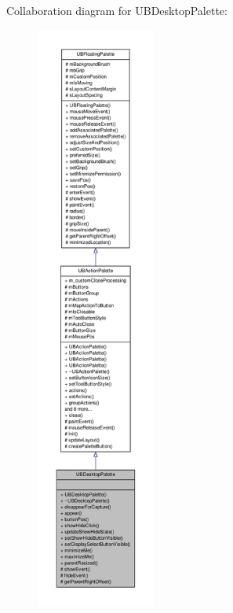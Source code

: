Collaboration diagram for U\-B\-Desktop\-Palette\-:
\nopagebreak
\begin{figure}[H]
\begin{center}
\leavevmode
\includegraphics[height=550pt]{d9/d6d/class_u_b_desktop_palette__coll__graph}
\end{center}
\end{figure}
